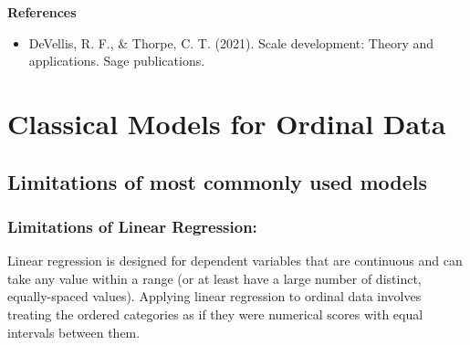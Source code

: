 \documentclass[
  letterpaper,
  DIV=11,
  numbers=noendperiod]{scrartcl}
\providecommand{\tightlist}{%
  \setlength{\itemsep}{0pt}\setlength{\parskip}{0pt}}\usepackage{longtable,booktabs,array}
\begin{document}
\textbf{References}

\begin{itemize}
\tightlist
\item
  DeVellis, R. F., \& Thorpe, C. T. (2021). Scale development: Theory
  and applications. Sage publications.
\end{itemize}

\hypertarget{classical-models-for-ordinal-data}{%
\section{Classical Models for Ordinal
Data}\label{classical-models-for-ordinal-data}}

\hypertarget{limitations-of-most-commonly-used-models}{%
\subsection{Limitations of most commonly used
models}\label{limitations-of-most-commonly-used-models}}

\hypertarget{limitations-of-linear-regression}{%
\subsubsection*{Limitations of Linear
Regression:}\label{limitations-of-linear-regression}}

Linear regression is designed for dependent variables that are
continuous and can take any value within a range (or at least have a
large number of distinct, equally-spaced values). Applying linear
regression to ordinal data involves treating the ordered categories as
if they were numerical scores with equal intervals between them.
\end{document}
